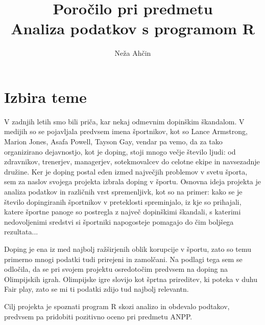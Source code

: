 \documentclass[11pt,a4paper]{article}
\begin{document}
\title{Poročilo pri predmetu \\
Analiza podatkov s programom R}
\author{Neža Ahčin}
\maketitle
\newpage
\section{Izbira teme}

V zadnjih letih smo bili priča, kar nekaj odmevnim dopinškim škandalom. V medijih so se pojavljala predvsem imena športnikov, kot so Lance Armstrong, Marion Jones, Asafa Powell, Tayson Gay, vendar pa vemo, da za tako organizirano dejavnostjo, kot je doping, stoji mnogo večje število ljudi: od zdravnikov, trenerjev, managerjev, sotekmovalcev do celotne ekipe in navsezadnje družine. Ker je doping postal eden izmed največjih problemov v svetu športa, sem za naslov svojega projekta izbrala doping v športu.
\newline
Osnovna ideja projekta je analiza podatkov in različnih vrst spremenljivk, kot so na primer: kako se je število dopingiranih športnikov v preteklosti spreminjalo, iz kje so prihajali, katere športne panoge so postregla z največ dopinškimi škandali, s katerimi nedovoljenimi sredstvi si športniki napogosteje pomagajo do čim boljšega rezultata...


Doping je ena iz med najbolj ražširjenih oblik korupcije v športu, zato so temu primerno mnogi podatki tudi prirejeni in zamolčani. Na podlagi tega sem se odločila, da se pri svojem projektu osredotočim predvsem na doping na Olimpijskih igrah. Olimpijske igre slovijo kot šprtna prireditev, ki poteka v duhu Fair play, zato se mi ti podatki zdijo tud najbolj relevantn.


%  
Cilj projekta je spoznati program R skozi analizo in obdevalo podtakov, predvsem pa pridobiti pozitivno oceno pri predmetu ANPP.
\end{document}
